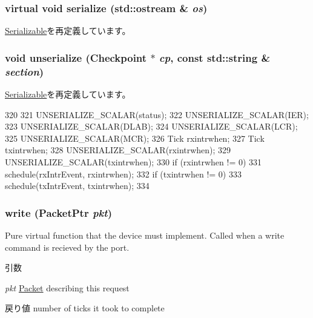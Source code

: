 \hypertarget{classUart8250_ad6272f80ae37e8331e3969b3f072a801}{
\subsubsection[{serialize}]{\setlength{\rightskip}{0pt plus 5cm}virtual void serialize (std::ostream \& {\em os})}}
\label{classUart8250_ad6272f80ae37e8331e3969b3f072a801}


\hyperlink{classSerializable_ad6272f80ae37e8331e3969b3f072a801}{Serializable}を再定義しています。\hypertarget{classUart8250_af22e5d6d660b97db37003ac61ac4ee49}{
\subsubsection[{unserialize}]{\setlength{\rightskip}{0pt plus 5cm}void unserialize ({\bf Checkpoint} $\ast$ {\em cp}, \/  const std::string \& {\em section})}}
\label{classUart8250_af22e5d6d660b97db37003ac61ac4ee49}


\hyperlink{classSerializable_af100c4e9feabf3cd918619c88c718387}{Serializable}を再定義しています。


\begin{DoxyCode}
320 {
321     UNSERIALIZE_SCALAR(status);
322     UNSERIALIZE_SCALAR(IER);
323     UNSERIALIZE_SCALAR(DLAB);
324     UNSERIALIZE_SCALAR(LCR);
325     UNSERIALIZE_SCALAR(MCR);
326     Tick rxintrwhen;
327     Tick txintrwhen;
328     UNSERIALIZE_SCALAR(rxintrwhen);
329     UNSERIALIZE_SCALAR(txintrwhen);
330     if (rxintrwhen != 0)
331         schedule(rxIntrEvent, rxintrwhen);
332     if (txintrwhen != 0)
333         schedule(txIntrEvent, txintrwhen);
334 }
\end{DoxyCode}
\hypertarget{classUart8250_a4cefab464e72b5dd42c003a0a4341802}{
\subsubsection[{write}]{ write ({\bf PacketPtr} {\em pkt})}}
\label{classUart8250_a4cefab464e72b5dd42c003a0a4341802}
Pure virtual function that the device must implement. Called when a write command is recieved by the port. 
\begin{DoxyParams}{引数}
\item[{\em pkt}]\hyperlink{classPacket}{Packet} describing this request \end{DoxyParams}
\begin{DoxyReturn}{戻り値}
number of ticks it took to complete 
\end{DoxyReturn}



